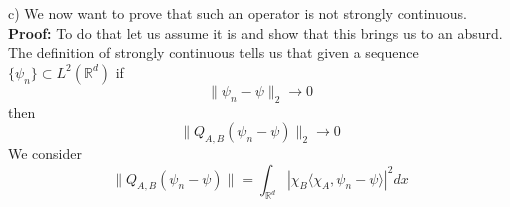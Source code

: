 \documentclass{article}
\newcommand{\R}{\mathbb{R}}
\newcommand{\1}{1\!\!1}
\newcommand{\proof}{\\ \textbf{Proof: }}
\begin{document}
c) We now want to prove that such an operator is not strongly continuous.
\proof To do that let us assume it is and show that this brings us to an absurd. The definition of strongly continuous tells us that given a sequence $\{ \psi_n \} \subset L^2(\R^d)$ if 
\[
    \| \psi_n - \psi \|_2 \to 0
\]
then
\[
    \| Q_{A,B} (\psi_n - \psi)\|_2 \to 0
\]
We consider 
\[
    \| Q_{A,B} (\psi_n -\psi) \| = \int_{ \R^d} | \chi_B \langle \chi_A, \psi_n - \psi \rangle |^2 dx
\]
\end{document}
